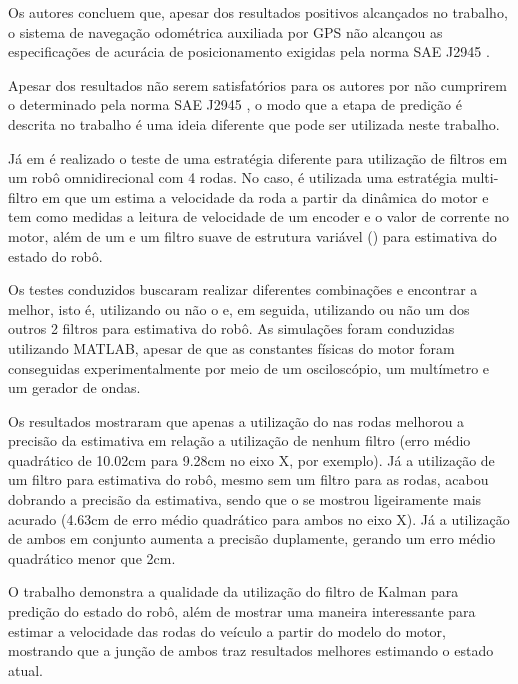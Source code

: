 \documentclass[acronym, symbols, table]{fei}
\begin{document}
Os autores concluem que, apesar dos resultados positivos alcançados no trabalho, o sistema de navegação odométrica auxiliada por GPS não alcançou as especificações de acurácia de posicionamento exigidas pela norma SAE J2945 \cite{sae2016board}.

Apesar dos resultados não serem satisfatórios para os autores por não cumprirem o determinado pela norma SAE J2945 \cite{sae2016board}, o modo que a etapa de predição é descrita no trabalho é uma ideia diferente que pode ser utilizada neste trabalho.

Já em \textcite{9233826} é realizado o teste de uma estratégia diferente para utilização de filtros em um robô omnidirecional com 4 rodas. No caso, é utilizada uma estratégia multi-filtro em que um  estima a velocidade da roda a partir da dinâmica do motor e tem como medidas a leitura de velocidade de um encoder e o valor de corrente no motor, além de um  e um filtro suave de estrutura variável () para estimativa do estado do robô.

Os testes conduzidos buscaram realizar diferentes combinações e encontrar a melhor, isto é, utilizando ou não o  e, em seguida, utilizando ou não um dos outros 2 filtros para estimativa do robô. As simulações foram conduzidas utilizando MATLAB, apesar de que as constantes físicas do motor foram conseguidas experimentalmente por meio de um osciloscópio, um multímetro e um gerador de ondas.

Os resultados mostraram que apenas a utilização do  nas rodas melhorou a precisão da estimativa em relação a utilização de nenhum filtro (erro médio quadrático de 10.02cm para 9.28cm no eixo X, por exemplo). Já a utilização de um filtro para estimativa do robô, mesmo sem um filtro para as rodas, acabou dobrando a precisão da estimativa, sendo que o  se mostrou ligeiramente mais acurado (4.63cm de erro médio quadrático para ambos no eixo X). Já a utilização de ambos em conjunto aumenta a precisão duplamente, gerando um erro médio quadrático menor que 2cm.

O trabalho demonstra a qualidade da utilização do filtro de Kalman para predição do estado do robô, além de mostrar uma maneira interessante para estimar a velocidade das rodas do veículo a partir do modelo do motor, mostrando que a junção de ambos traz resultados melhores estimando o estado atual.
\end{document}
